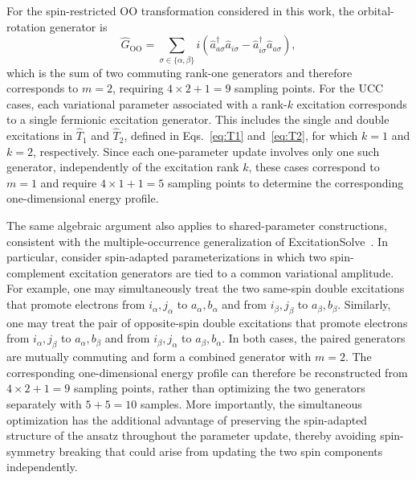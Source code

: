 \documentclass[
 reprint,
 amsmath,amssymb,
 aps,
 physrev,
]{revtex4-2}
\begin{document}
For the spin-restricted OO transformation considered in this work, the orbital-rotation generator is
%
\begin{equation}
    \label{eq:oo_generator}
    \hat{G}_{\mathrm{OO}}
    =
    \sum_{\sigma \in \{\alpha,\beta \}}
    i
    \left(
    \hat{a}_{a\sigma}^{\dagger}
    \hat{a}_{i\sigma}
    -
    \hat{a}_{i\sigma}^{\dagger}
    \hat{a}_{a\sigma}
    \right),
\end{equation}
%
which is the sum of two commuting rank-one generators and therefore corresponds to \( m=2 \), requiring \( 4 \times 2 + 1 = 9 \) sampling points.
For the UCC cases, each variational parameter associated with a rank-\(k\) excitation corresponds to a single fermionic excitation generator. This includes the single and double excitations in \(\hat{T}_1\) and \(\hat{T}_2\), defined in Eqs.~\eqref{eq:T1} and~\eqref{eq:T2}, for which \(k=1\) and \(k=2\), respectively. Since each one-parameter update involves only one such generator, independently of the excitation rank \(k\), these cases correspond to \(m=1\) and require \(4\times 1+1=5\) sampling points to determine the corresponding one-dimensional energy profile.

The same algebraic argument also applies to shared-parameter constructions, consistent with the multiple-occurrence generalization of ExcitationSolve~\cite{jager2025}. In particular, consider spin-adapted parameterizations in which two spin-complement excitation generators are tied to a common variational amplitude. For example, one may simultaneously treat the two same-spin double excitations that promote electrons from \(i_\alpha,j_\alpha\) to \(a_\alpha,b_\alpha\) and from \(i_\beta,j_\beta\) to \(a_\beta,b_\beta\). Similarly, one may treat the pair of opposite-spin double excitations that promote electrons from \(i_\alpha,j_\beta\) to \(a_\alpha,b_\beta\) and from \(i_\beta,j_\alpha\) to \(a_\beta,b_\alpha\). In both cases, the paired generators are mutually commuting and form a combined generator with \(m=2\). The corresponding one-dimensional energy profile can therefore be reconstructed from \(4\times 2+1=9\) sampling points, rather than optimizing the two generators separately with \(5+5=10\) samples. More importantly, the simultaneous optimization has the additional advantage of preserving the spin-adapted structure of the ansatz throughout the parameter update, thereby avoiding spin-symmetry breaking that could arise from updating the two spin components independently.
%
\end{document}
